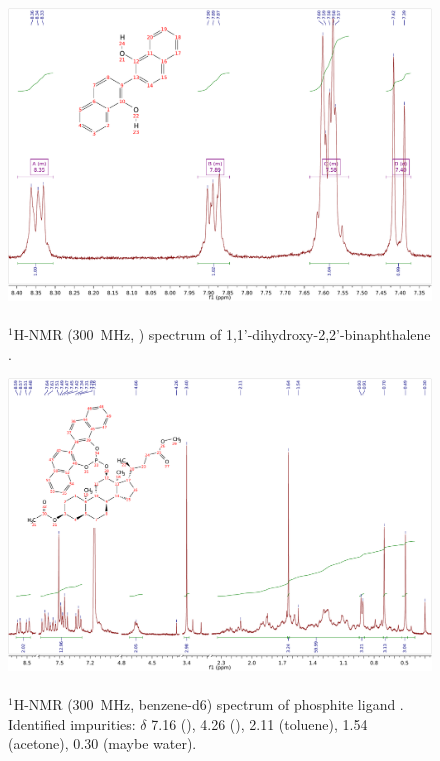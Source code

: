 \ifpdf
\begin{figure}%
 \centering
 \includegraphics[width=1\textwidth]{sp/dhn-crop.pdf}
  \caption{\\$^1$H-NMR (300~MHz, ) spectrum of 1,1'-dihydroxy-2,2'-binaphthalene . \label{sp:dhn}}
\end{figure}
\else
\fignoeps
\fi


\ifpdf
\begin{figure}%
 \centering
 \includegraphics[width=1\textwidth]{sp/legante-crop.pdf}
  \caption{\\$^1$H-NMR (300~MHz, benzene-d6) spectrum of phosphite ligand . Identified impurities: $\delta$ 7.16 (), 4.26 (), 2.11 (toluene), 1.54 (acetone), 0.30 (maybe water). \label{sp:legante}}
\end{figure}
\else
\fignoeps
\fi

